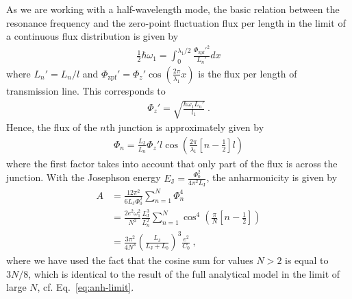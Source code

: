 As we are working with a half-wavelength mode, the basic relation between the resonance frequency and the zero-point fluctuation flux per length in the limit of a continuous flux distribution is given by
%
\begin{align}
\frac{1}{2}\hbar \omega_1 = \int_0^{\lambda_1/2} \frac{\Phi_\text{zpf}'^2}{L_n'} dx
\end{align}
%
where $L_n' = L_n/l$ and $\Phi_\text{zpf}' = \Phi_z'\cos\left(\frac{2\pi}{\lambda_1}x\right)$ is the flux per length of transmission line.
%
This corresponds to
%
\begin{align}
\Phi_z' = \sqrt{\frac{\hbar \omega_1 L_n'}{l_1}}\ .
\end{align}
%
Hence, the flux of the $n$th junction is approximately given by
%
\begin{align}
\Phi_n = \frac{L_\text{J}}{L_n}\Phi_z' l \cos{\left(\frac{2\pi}{\lambda_1}\left[n-\frac{1}{2}\right]l\right)}
\end{align}
%
where the first factor takes into account that only part of the flux is across the junction.
%
With the Josephson energy $E_\text{J} = \frac{\Phi_0^2}{4\pi^2 L_\text{J}}$, the anharmonicity is given by
%
\begin{align}
A &= \frac{12\pi^2}{6L_\text{J}\Phi_0^2}\sum_{n=1}^N \Phi_n^4 \\
&= \frac{2e^2 \omega_1^2}{N^2} \frac{L_\text{J}^3}{L_n^2}\sum_{n=1}^{N}\cos^4\left(\frac{\pi}{N}\left[n-\frac{1}{2}\right] \right) \\
&= \frac{3\pi^2}{4N^3}\left(\frac{L_\text{J}}{L_\text{J}+L_0}\right)^3 \frac{e^2}{C_0} \ ,
\label{eq:anh-closed}
\end{align}
%
where we have used the fact that the cosine sum for values $N>2$ is equal to $3N/8$, which is identical to the result of the full analytical model in the limit of large $N$, cf. Eq.~\eqref{eq:anh-limit}.



